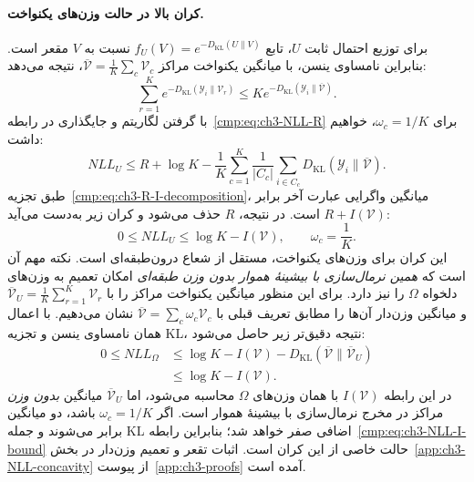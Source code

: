\paragraph{کران بالا در حالت وزن‌های یکنواخت.}
برای توزیع احتمال ثابت $U$، تابع $f_U(V)=e^{-D_{\mathrm{KL}}(U\|V)}$ نسبت به $V$ مقعر است. بنابراین نامساوی ینسن، با میانگین یکنواخت مراکز $\overline{\mathcal V}=\frac1K\sum_c\mathcal V_c$، نتیجه می‌دهد:
\begin{equation}\label{cmp:eq:ch3-NLL-Jensen}
\sum_{r=1}^{K}e^{-D_{\mathrm{KL}}(\mathscr Y_i\|\mathcal V_r)}
\le K e^{-D_{\mathrm{KL}}(\mathscr Y_i\|\overline{\mathcal V})}.
\end{equation}
با گرفتن لگاریتم و جایگذاری در رابطه~\eqref{cmp:eq:ch3-NLL-R} برای $\omega_c=1/K$، خواهیم داشت:
\begin{equation}\label{cmp:eq:ch3-NLL-pre-I}
NLL_U\le R+\log K-\frac1K\sum_{c=1}^{K}
\frac1{|C_c|}\sum_{i\in C_c}
D_{\mathrm{KL}}(\mathscr Y_i\|\overline{\mathcal V}).
\end{equation}
طبق تجزیه~\eqref{cmp:eq:ch3-R-I-decomposition}، میانگین واگرایی عبارت آخر برابر $R+I(\mathcal V)$ است. در نتیجه، $R$ حذف می‌شود و کران زیر به‌دست می‌آید:
\begin{equation}\label{cmp:eq:ch3-NLL-I-bound}
\boxed{0\le NLL_U\le\log K-I(\mathcal V),
\qquad \omega_c=\frac1K.}
\end{equation}
این کران برای وزن‌های یکنواخت، مستقل از شعاع درون‌طبقه‌ای است. نکته مهم آن است که \emph{همین نرمال‌سازی با بیشینهٔ هموار بدون وزن طبقه‌ای} امکان تعمیم به وزن‌های دلخواه $\Omega$ را نیز دارد. برای این منظور میانگین یکنواخت مراکز را با $\overline{\mathcal V}_U=\frac1K\sum_{r=1}^{K}\mathcal V_r$ و میانگین وزن‌دار آن‌ها را مطابق تعریف قبلی با $\overline{\mathcal V}=\sum_c\omega_c\mathcal V_c$ نشان می‌دهیم. با اعمال همان نامساوی ینسن و تجزیه KL، نتیجه دقیق‌تر زیر حاصل می‌شود:
\begin{equation}\label{cmp:eq:ch3-NLL-weighted-I-bound}
\boxed{
\begin{aligned}
0\le NLL_\Omega
&\le\log K-I(\mathcal V)
-D_{\mathrm{KL}}(\overline{\mathcal V}\|\overline{\mathcal V}_U)\\
&\le\log K-I(\mathcal V).
\end{aligned}}
\end{equation}
در این رابطه $I(\mathcal V)$ با همان وزن‌های $\Omega$ محاسبه می‌شود، اما $\overline{\mathcal V}_U$ میانگین \emph{بدون وزن} مراکز در مخرج نرمال‌سازی با بیشینهٔ هموار است. اگر $\omega_c=1/K$ باشد، دو میانگین برابر می‌شوند و جمله KL اضافی صفر خواهد شد؛ بنابراین رابطه~\eqref{cmp:eq:ch3-NLL-I-bound} حالت خاصی از این کران است. اثبات تقعر و تعمیم وزن‌دار در بخش~\ref{app:ch3-NLL-concavity} از پیوست~\ref{app:ch3-proofs} آمده است.


